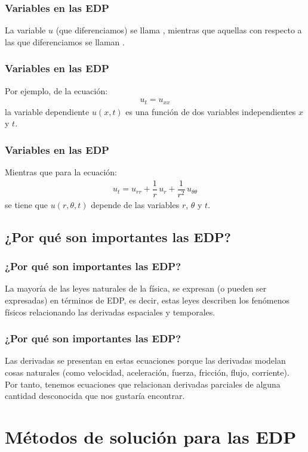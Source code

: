 \documentclass[12pt]{beamer}
\begin{document}
\begin{frame}
\frametitle{Variables en las EDP}
La variable $u$ (que diferenciamos) se llama , \pause mientras que aquellas con respecto a las que diferenciamos se llaman .
\end{frame}
\begin{frame}
\frametitle{Variables en las EDP}
Por ejemplo, de la ecuación:
\pause
\begin{align*}
u_{t} = u_{xx}
\end{align*}
la variable dependiente $u (x, t)$ es una función de dos variables independientes $x$ y $t$.
\end{frame}
\begin{frame}
\frametitle{Variables en las EDP}
Mientras que para la ecuación:
\pause
\begin{align*}
u_{t} = u_{rr} + \dfrac{1}{r} \, u_{r} + \dfrac{1}{r^{2}} \, u_{\theta \theta}
\end{align*}
se tiene que $u (r, \theta, t)$ depende de las variables $r$, $\theta$ y $t$.
\end{frame}

\subsection{¿Por qué son importantes las EDP?}

\begin{frame}
\frametitle{¿Por qué son importantes las EDP?}
La mayoría de las leyes naturales de la física, se expresan (o pueden ser expresadas) en términos de EDP, es decir, estas leyes describen los fenómenos físicos relacionando las derivadas espaciales y temporales.
\end{frame}
\begin{frame}
\frametitle{¿Por qué son importantes las EDP?}
Las derivadas se presentan en estas ecuaciones porque las derivadas modelan cosas naturales (como velocidad, aceleración, fuerza, fricción, flujo, corriente). 
\\
\bigskip
\pause
Por tanto, tenemos ecuaciones que relacionan derivadas parciales de alguna cantidad desconocida que nos gustaría encontrar.
\end{frame}

\section{Métodos de solución para las EDP}
\end{document}
